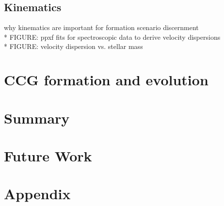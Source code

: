 \documentclass[iop,apj,twocolappendix]{emulateapj}
\begin{document}
\subsection{Kinematics}
\noindent * why kinematics are important for formation scenario discernment\\
* FIGURE: ppxf fits for spectroscopic data to derive velocity dispersions \\
* FIGURE: velocity dispersion vs. stellar mass

\section{CCG formation and evolution} %



\section{Summary}



\section{Future Work}





\section{Appendix}
\end{document}
